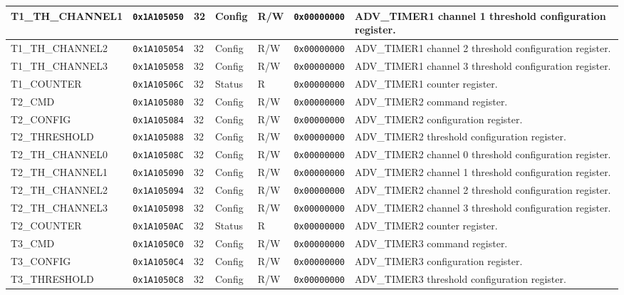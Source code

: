 {\begin{tabularx}{\textwidth}{|l|l|l|l|l|l|X|}
  \hline
  T1\_TH\_CHANNEL1 & \texttt{0x1A105050} & 32 & Config & R/W & \texttt{0x00000000} & ADV\_TIMER1 channel 1 threshold configuration register.\\
  \hline
  T1\_TH\_CHANNEL2 & \texttt{0x1A105054} & 32 & Config & R/W & \texttt{0x00000000} & ADV\_TIMER1 channel 2 threshold configuration register.\\
  \hline
  T1\_TH\_CHANNEL3 & \texttt{0x1A105058} & 32 & Config & R/W & \texttt{0x00000000} & ADV\_TIMER1 channel 3 threshold configuration register.\\
  \hline
  T1\_COUNTER & \texttt{0x1A10506C} & 32 & Status & R & \texttt{0x00000000} & ADV\_TIMER1 counter register.\\
  \hline
  T2\_CMD & \texttt{0x1A105080} & 32 & Config & R/W & \texttt{0x00000000} & ADV\_TIMER2 command register.\\
  \hline
  T2\_CONFIG & \texttt{0x1A105084} & 32 & Config & R/W & \texttt{0x00000000} & ADV\_TIMER2 configuration register.\\
  \hline
  T2\_THRESHOLD & \texttt{0x1A105088} & 32 & Config & R/W & \texttt{0x00000000} & ADV\_TIMER2 threshold configuration register.\\
  \hline
  T2\_TH\_CHANNEL0 & \texttt{0x1A10508C} & 32 & Config & R/W & \texttt{0x00000000} & ADV\_TIMER2 channel 0 threshold configuration register.\\
  \hline
  T2\_TH\_CHANNEL1 & \texttt{0x1A105090} & 32 & Config & R/W & \texttt{0x00000000} & ADV\_TIMER2 channel 1 threshold configuration register.\\
  \hline
  T2\_TH\_CHANNEL2 & \texttt{0x1A105094} & 32 & Config & R/W & \texttt{0x00000000} & ADV\_TIMER2 channel 2 threshold configuration register.\\
  \hline
  T2\_TH\_CHANNEL3 & \texttt{0x1A105098} & 32 & Config & R/W & \texttt{0x00000000} & ADV\_TIMER2 channel 3 threshold configuration register.\\
  \hline
  T2\_COUNTER & \texttt{0x1A1050AC} & 32 & Status & R & \texttt{0x00000000} & ADV\_TIMER2 counter register.\\
  \hline
  T3\_CMD & \texttt{0x1A1050C0} & 32 & Config & R/W & \texttt{0x00000000} & ADV\_TIMER3 command register.\\
  \hline
  T3\_CONFIG & \texttt{0x1A1050C4} & 32 & Config & R/W & \texttt{0x00000000} & ADV\_TIMER3 configuration register.\\
  \hline
  T3\_THRESHOLD & \texttt{0x1A1050C8} & 32 & Config & R/W & \texttt{0x00000000} & ADV\_TIMER3 threshold configuration register.\\

\end{tabularx}}
